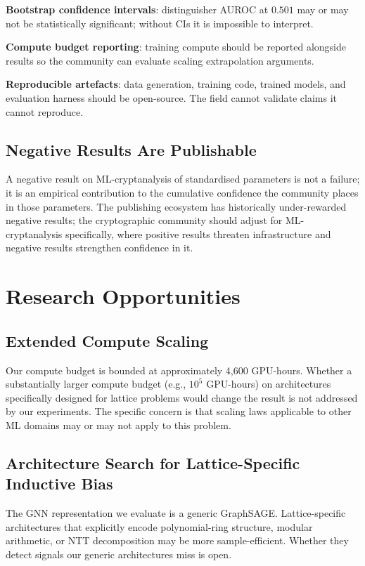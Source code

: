 \documentclass[sigconf,nonacm]{acmart}
\begin{document}
\textbf{Bootstrap confidence intervals}: distinguisher AUROC at
$0.501$ may or may not be statistically significant; without CIs
it is impossible to interpret.

\textbf{Compute budget reporting}: training compute should be
reported alongside results so the community can evaluate scaling
extrapolation arguments.

\textbf{Reproducible artefacts}: data generation, training code,
trained models, and evaluation harness should be open-source. The
field cannot validate claims it cannot reproduce.

\subsection{Negative Results Are Publishable}

A negative result on ML-cryptanalysis of standardised parameters is
not a failure; it is an empirical contribution to the cumulative
confidence the community places in those parameters. The publishing
ecosystem has historically under-rewarded negative results; the
cryptographic community should adjust for ML-cryptanalysis specifically,
where positive results threaten infrastructure and negative results
strengthen confidence in it.

\section{Research Opportunities}

\subsection{Extended Compute Scaling}

Our compute budget is bounded at approximately 4{,}600 GPU-hours.
Whether a substantially larger compute budget (e.g., $10^5$
GPU-hours) on architectures specifically designed for lattice
problems would change the result is not addressed by our
experiments. The specific concern is that scaling laws applicable
to other ML domains may or may not apply to this problem.

\subsection{Architecture Search for Lattice-Specific Inductive Bias}

The GNN representation we evaluate is a generic GraphSAGE.
Lattice-specific architectures that explicitly encode polynomial-ring
structure, modular arithmetic, or NTT decomposition may be more
sample-efficient. Whether they detect signals our generic
architectures miss is open.
\end{document}
